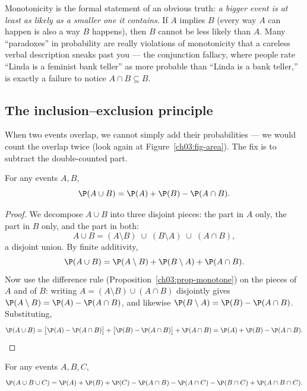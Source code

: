 Monotonicity is the formal statement of an obvious truth: \emph{a bigger event is
at least as likely as a smaller one it contains}. If $A$ implies $B$ (every way
$A$ can happen is also a way $B$ happens), then $B$ cannot be less likely than
$A$. Many ``paradoxes'' in probability are really violations of monotonicity that
a careless verbal description sneaks past you --- the conjunction fallacy, where
people rate ``Linda is a feminist bank teller'' as more probable than ``Linda is
a bank teller,'' is exactly a failure to notice $A \cap B \subseteq B$.

\subsection{The inclusion--exclusion principle}
\label{ch03:incl-excl}

When two events overlap, we cannot simply add their probabilities --- we would
count the overlap twice (look again at Figure~\ref{ch03:fig-area}). The fix is to
subtract the double-counted part.

\begin{theorem}
\label{ch03:thm-ie2}
For any events $A, B$,
\[
\P(A \cup B) = \P(A) + \P(B) - \P(A \cap B).
\]
\end{theorem}

\begin{proof}
We decompose $A \cup B$ into three disjoint pieces: the part in $A$ only, the
part in $B$ only, and the part in both:
\[
A \cup B = (A \setminus B) \;\cup\; (B \setminus A) \;\cup\; (A \cap B),
\]
a disjoint union. By finite additivity,
\[
\P(A \cup B) = \P(A \setminus B) + \P(B \setminus A) + \P(A \cap B).
\]
Now use the difference rule (Proposition~\ref{ch03:prop-monotone}) on the pieces of
$A$ and of $B$: writing $A = (A\setminus B) \cup (A \cap B)$ disjointly gives
$\P(A \setminus B) = \P(A) - \P(A \cap B)$, and likewise
$\P(B \setminus A) = \P(B) - \P(A \cap B)$. Substituting,
\[
\P(A \cup B) = \big[\P(A) - \P(A\cap B)\big] + \big[\P(B) - \P(A\cap B)\big] +
\P(A \cap B) = \P(A) + \P(B) - \P(A \cap B). \qedhere
\]
\end{proof}

\begin{theorem}
\label{ch03:thm-ie3}
For any events $A, B, C$,
\[
\P(A \cup B \cup C) = \P(A) + \P(B) + \P(C) - \P(A\cap B) - \P(A \cap C) -
\P(B \cap C) + \P(A \cap B \cap C).
\]
\end{theorem}

